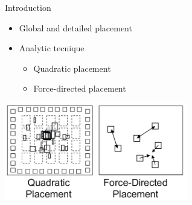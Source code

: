 \documentclass{beamer}
\begin{document}
\begin{frame}{Introduction}
\begin{itemize}
\item Global and detailed placement
\item Analytic tecnique
\begin{itemize}
\item Quadratic placement
\item Force-directed placement
\end{itemize}
\end{itemize}

\centering
\includegraphics[width=0.6\textwidth]{images/placement.png}

\end{frame}
\end{document}

